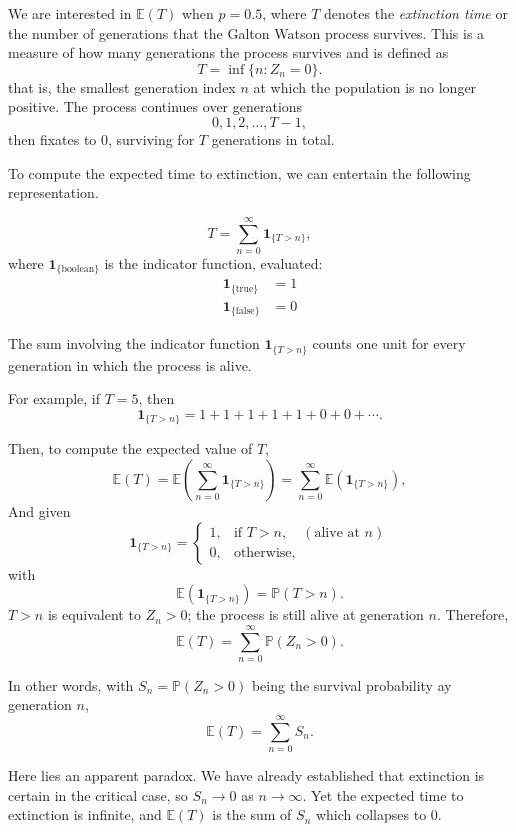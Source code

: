 \documentclass[11pt,a4paper]{article}
\theoremstyle{plain}
\theoremstyle{definition}
\begin{document}
We are interested in $\mathbb{E}(T)$ when $p = 0.5$, where $T$ denotes the
\emph{extinction time} or the number of generations that the Galton Watson process survives. This is a measure of how many generations the process
survives and is defined as
\[
T = \inf \{ n : Z_n = 0 \}.
\]
that is, the smallest generation index $n$ at which the population is no longer positive.
The process continues over generations
\[
0, 1, 2, \dots, T-1,
\]
then fixates to 0, surviving for $T$ generations in total.

To compute the expected time to extinction, we can entertain the following representation.

\[
T = \sum_{n=0}^{\infty} \mathbf{1}_{\{ T > n \}},
\]
where $\mathbf{1}_{\{\text{boolean}\}}$ is the indicator function, evaluated:
\begin{align*}
    \mathbf{1}_{\{ \text{true}\}} &= 1 \\
    \mathbf{1}_{\{ \text{false}\}} &= 0
\end{align*}



\noindent
The sum involving the indicator function $\mathbf{1}_{\{T>n\}}$ counts one unit
for every generation in which the process is alive.

For example, if $T = 5$, then
\[
\mathbf{1}_{\{T>n\}} = 1 + 1 + 1 + 1 + 1 + 0 + 0 + \cdots .
\]

\noindent
Then, to compute the expected value of $T$,
\[
\mathbb{E}(T)
= \mathbb{E}\!\left( \sum_{n=0}^{\infty} \mathbf{1}_{\{T>n\} } \right)
= \sum_{n=0}^{\infty} \mathbb{E}\!\left( \mathbf{1}_{\{T>n\}} \right),
\]
And given
\[
\mathbf{1}_{\{T>n\}} =
\begin{cases} 
1, & \text{if } T>n, \quad(\text{alive at } n) \\
0, & \text{otherwise},
\end{cases}
\]
with
\[
\mathbb{E}\!\left( \mathbf{1}_{\{T>n\}} \right)
= \mathbb{P}(T>n).
\]
\noindent
$T>n$ is equivalent to $Z_n>0$; the process is still
alive at generation $n$. Therefore,
\[
\mathbb{E}(T)
= \sum_{n=0}^{\infty} \mathbb{P}(Z_n>0).
\]

\noindent
In other words, with $S_n = \mathbb{P}(Z_n>0)$ being the survival probability ay generation $n$,
\[
\mathbb{E}(T) = \sum_{n=0}^{\infty} S_n.
\]

\noindent
Here lies an apparent paradox. We have already established that extinction is certain in the critical case, so $S_n \to 0$ as $n \to \infty$.
Yet the expected time to extinction is infinite, and $\mathbb{E}(T)$ is the sum of $S_n$ which collapses to 0.
\end{document}
